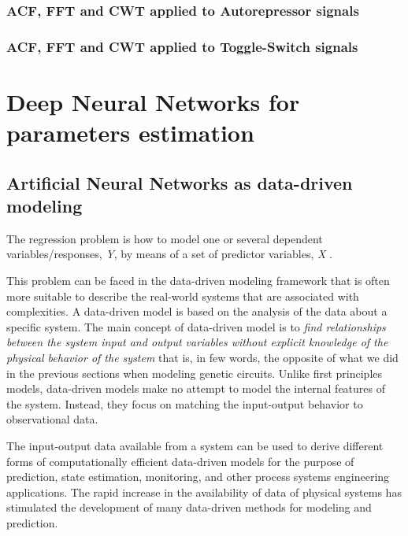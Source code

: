 \documentclass[12pt,a4paper]{report}
\begin{document}
\section{ACF, FFT and CWT applied to Autorepressor signals}

\section{ACF, FFT and CWT applied to Toggle-Switch signals}

\part{Deep Neural Networks for parameters estimation}
\chapter{Artificial Neural Networks as data-driven modeling}
The regression problem is how to model one or several dependent variables/responses, \emph{Y}, by means of a set of predictor variables, \emph{X} \cite{datadrivenmodeling}. 

This problem can be faced in the data-driven modeling framework that is often more suitable to describe the real-world systems that are associated with complexities. A data-driven model is based on the analysis of the data about a specific system. The main concept of data-driven model is to \emph{find relationships between the system input and output variables without explicit knowledge of the physical behavior of the system} that is, in few words, the opposite of what we did in the previous sections when modeling genetic circuits. Unlike first principles models, data-driven models make no attempt to model the internal features of the system. Instead, they focus on matching the input-output behavior to observational data. 

The input-output data available from a system can be used to derive different forms of computationally efficient data-driven models for the purpose of prediction, state estimation, monitoring, and other process systems engineering applications. The rapid increase in the availability of data of physical systems has stimulated the development of many data-driven methods for modeling and prediction. 
\end{document}
